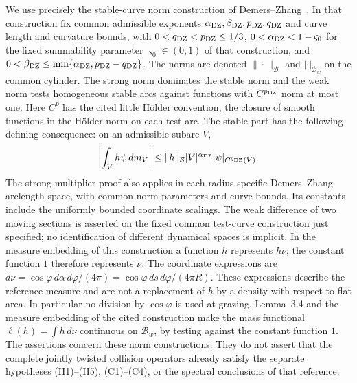We use precisely the stable-curve norm construction of
Demers--Zhang~\cite[Sect.~3.3, Lemmas~5.2--5.3]{DZUniform}.
In that construction fix common admissible exponents
$\alpha_{\rm DZ},\beta_{\rm DZ},p_{\rm DZ},q_{\rm DZ}$ and
curve length and curvature bounds, with
$0<q_{\rm DZ}<p_{\rm DZ}\le1/3$,
$0<\alpha_{\rm DZ}<1-\varsigma_0$ for the fixed summability
parameter $\varsigma_0\in(0,1)$ of that construction, and
$0<\beta_{\rm DZ}\le\min\{\alpha_{\rm DZ},p_{\rm DZ}-q_{\rm DZ}\}$.
The norms are denoted $\|\cdot\|_{\mathcal B}$ and
$|\cdot|_{\mathcal B_w}$ on the common cylinder. The strong norm
dominates the stable norm and the weak norm tests homogeneous stable
arcs against functions with $C^{p_{\rm DZ}}$ norm at most one.
Here $C^p$ has the cited little H\"older convention, the closure
of smooth functions in the H\"older norm on each test arc.
The stable part has the following defining consequence: on an
admissible subarc $V$,
\begin{equation}\label{eq:sm-short-arc}
 \left|\int_V h\psi\,dm_V\right|
 \le \|h\|_{\mathcal B}|V|^{\alpha_{\rm DZ}}
                           |\psi|_{C^{q_{\rm DZ}}(V)}.
\end{equation}
The strong multiplier proof also applies in each radius-specific
Demers--Zhang arclength space, with common norm parameters and curve
bounds. Its constants include the uniformly bounded coordinate
scalings. The weak difference of two moving sections is asserted
on the fixed common test-curve construction just specified; no
identification of different dynamical spaces is implicit. In the
measure embedding of this construction a function $h$ represents
$h\nu$; the constant function $1$ therefore represents $\nu$.
The coordinate expressions are
$d\nu=\cos\varphi\,d\alpha\,d\varphi/(4\pi)
=\cos\varphi\,ds\,d\varphi/(4\pi R)$.
These expressions describe the reference measure and are not a
replacement of $h$ by a density with respect to flat area. In
particular no division by $\cos\varphi$ is used at grazing.
Lemma~3.4 and the measure embedding of the cited construction
make the mass functional $\ell(h)=\int h\,d\nu$ continuous on
$\mathcal B_w$, by testing against the constant function $1$.
The assertions concern these norm constructions. They
do not assert that the complete jointly twisted collision operators
already satisfy the separate hypotheses (H1)--(H5), (C1)--(C4), or
the spectral conclusions of that reference.

